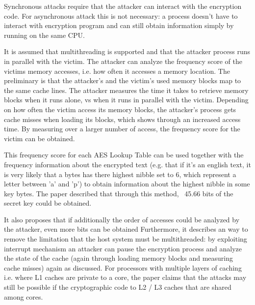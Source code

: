 Synchronous attacks require that the attacker can interact with the encryption code.
For asynchronous attack this is not necessary: a process doesn't have to interact with encryption program and can still obtain information simply by running on the same CPU.

It is assumed that multithreading is supported and that the attacker process runs in parallel with the victim.
The attacker can analyze the frequency score of the victims memory accesses, i.e. how often it accesses a memory location.
The preliminary is that the attacker's and the victim's used memory blocks map to the same cache lines.
The attacker measures the time it takes to retrieve memory blocks when it runs alone, vs when it runs in parallel with the victim.
Depending on how often the victim access its memory blocks, the attacker's process gets cache misses when loading its blocks, which shows through an increased access time.
By measuring over a larger number of access, the frequency score for the victim can be obtained.

This frequency score for each AES Lookup Table can be used together with the frequency information about the encrypted text (e.g. that if it's an english text, it is very likely that a bytes has there highest nibble set to 6, which represent a letter between 'a' and 'p') to obtain information about the highest nibble in some key bytes.
The paper described that through this method, ~45.66 bits of the secret key could be obtained.

It also proposes that if additionally the order of accesses could be analyzed by the attacker, even more bits can be obtained
Furthermore, it describes an way to remove the limitation that the host system must be multithreaded: by exploiting interrupt mechanism an attacker can pause the encryption process and analyze the state of the cache (again through loading memory blocks and measuring cache misses) again as discussed.
For processors with multiple layers of caching i.e. where L1 caches are private to a core, the paper claims that the attacks may still be possible if the cryptographic code to L2 / L3 caches that are shared among cores.

